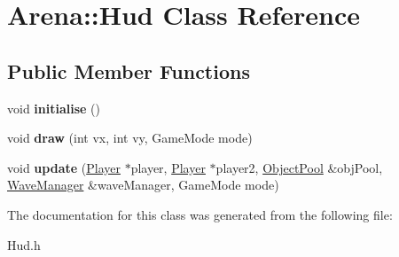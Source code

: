 \hypertarget{class_arena_1_1_hud}{\section{Arena\+:\+:Hud Class Reference}
\label{class_arena_1_1_hud}
}
\subsection*{Public Member Functions}
\begin{DoxyCompactItemize}
\item 
\hypertarget{class_arena_1_1_hud_a78acdb2aee46d2e04a588a90b783b672}{void {\bfseries initialise} ()}\label{class_arena_1_1_hud_a78acdb2aee46d2e04a588a90b783b672}

\item 
\hypertarget{class_arena_1_1_hud_abfce460d291dc631a516c54643eb7d60}{void {\bfseries draw} (int vx, int vy, Game\+Mode mode)}\label{class_arena_1_1_hud_abfce460d291dc631a516c54643eb7d60}

\item 
\hypertarget{class_arena_1_1_hud_a6612095b06b8faace968ece915b3750c}{void {\bfseries update} (\hyperlink{class_arena_1_1_player}{Player} $\ast$player, \hyperlink{class_arena_1_1_player}{Player} $\ast$player2, \hyperlink{class_arena_1_1_object_pool}{Object\+Pool} \&obj\+Pool, \hyperlink{class_arena_1_1_wave_manager}{Wave\+Manager} \&wave\+Manager, Game\+Mode mode)}\label{class_arena_1_1_hud_a6612095b06b8faace968ece915b3750c}

\end{DoxyCompactItemize}


The documentation for this class was generated from the following file\+:\begin{DoxyCompactItemize}
\item 
Hud.\+h\end{DoxyCompactItemize}
